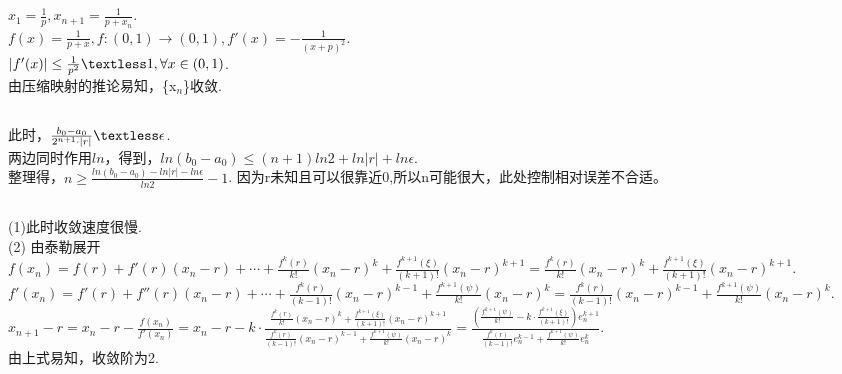 \documentclass[UTF8]{ctexart}
\begin{document}
\subsection{}
$x_1=\frac{1}{p}, x_{n+1}=\frac{1}{p+x_n}$.\\
$f(x)=\frac{1}{p+x},f:(0,1)\rightarrow (0,1),f'(x)=-\frac{1}{(x+p)^2}.$\\
$\vert f'(x)\vert \le \frac{1}{p^2} \textless 1, \forall x\in(0,1)$.\\
由压缩映射的推论易知，\{x$_n$\}收敛.
\subsection{}
此时，$\frac{b_0-a_0}{2^{n+1}\cdot \vert r \vert}\textless \epsilon$.\\
两边同时作用$ln$，得到，$ln(b_0-a_0)\le(n+1)ln2+ln\vert r \vert +ln\epsilon$.\\
整理得，$n \ge \frac{ln(b_0-a_0)-ln\vert r\vert- ln\epsilon}{ln2}-1$.
因为r未知且可以很靠近0,所以n可能很大，此处控制相对误差不合适。
\subsection{}
(1)此时收敛速度很慢.\\
(2)
由泰勒展开\\
$f(x_n)=f(r)+f'(r)(x_n-r)+\cdots+\frac{f^k(r)}{k!}(x_n-r)^k+\frac{f^{k+1}(\xi)}{(k+1)!}(x_n-r)^{k+1}=\frac{f^k(r)}{k!}(x_n-r)^k+\frac{f^{k+1}(\xi)}{(k+1)!}(x_n-r)^{k+1}.$\\
$f'(x_n)=f'(r)+f''(r)(x_n-r)+\cdots+\frac{f^k(r)}{(k-1)!}(x_n-r)^{k-1}+\frac{f^{k+1}(\psi)}{k!}(x_n-r)^k=\frac{f^k(r)}{(k-1)!}(x_n-r)^{k-1}+\frac{f^{k+1}(\psi)}{k!}(x_n-r)^k.$\\ 
$x_{n+1}-r=x_n-r-\frac{f(x_n)}{f'(x_n)}=x_n-r-k\cdot\frac{\frac{f^k(r)}{k!}(x_n-r)^k+\frac{f^{k+1}(\xi)}{(k+1)!}(x_n-r)^{k+1}}{\frac{f^k(r)}{(k-1)!}(x_n-r)^{k-1}+\frac{f^{k+1}(\psi)}{k!}(x_n-r)^k}=\frac{(\frac{f^{k+1}(\psi)}{k!}-k\cdot\frac{f^{k+1}(\xi)}{(k+1)!})e_n^{k+1}}{\frac{f^k(r)}{(k-1)!}e_{n}^{k-1}+\frac{f^{k+1}(\psi)}{k!}e_{n}^k}$.\\
由上式易知，收敛阶为2.
\end{document}
